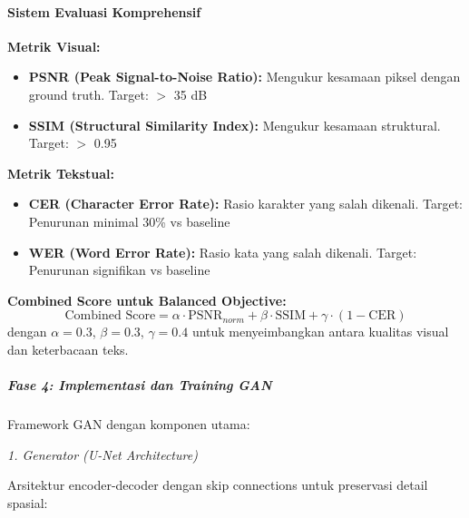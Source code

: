 \documentclass[12pt,a4paper]{article}
\begin{document}
\paragraph{Sistem Evaluasi Komprehensif}
\textbf{Metrik Visual:}
\begin{itemize}
    \item \textbf{PSNR (Peak Signal-to-Noise Ratio):} Mengukur kesamaan piksel dengan ground truth. Target: $>$ 35 dB
    \item \textbf{SSIM (Structural Similarity Index):} Mengukur kesamaan struktural. Target: $>$ 0.95
\end{itemize}

\textbf{Metrik Tekstual:}
\begin{itemize}
    \item \textbf{CER (Character Error Rate):} Rasio karakter yang salah dikenali. Target: Penurunan minimal 30\% vs baseline
    \item \textbf{WER (Word Error Rate):} Rasio kata yang salah dikenali. Target: Penurunan signifikan vs baseline
\end{itemize}

\textbf{Combined Score untuk Balanced Objective:}
\begin{equation}
\text{Combined Score} = \alpha \cdot \text{PSNR}_{norm} + \beta \cdot \text{SSIM} + \gamma \cdot (1 - \text{CER})
\end{equation}
dengan $\alpha = 0.3$, $\beta = 0.3$, $\gamma = 0.4$ untuk menyeimbangkan antara kualitas visual dan keterbacaan teks.

\subparagraph{Fase 4: Implementasi dan Training GAN}

Framework GAN dengan komponen utama:

\textit{1. Generator (U-Net Architecture)}

Arsitektur encoder-decoder dengan skip connections untuk preservasi detail spasial:
\end{document}
